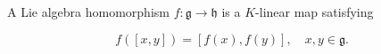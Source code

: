 A Lie algebra homomorphism $f: \mathfrak{g} \to \mathfrak{h}$ is a $K$-linear map satisfying

$$f([x, y]) = [f(x), f(y)], \quad x, y \in \mathfrak{g}.$$
